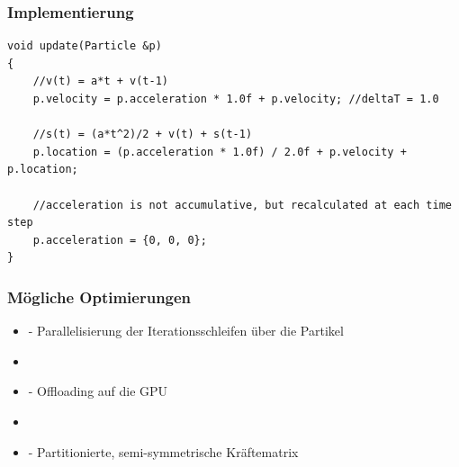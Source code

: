 \documentclass{beamer}
\begin{document}
\begin{frame}[fragile]
\frametitle{Implementierung}
\begin{lstlisting}[caption=Update Funktion]
void update(Particle &p)
{
	//v(t) = a*t + v(t-1)                                                            
	p.velocity = p.acceleration * 1.0f + p.velocity; //deltaT = 1.0                                  
                                                                                           
	//s(t) = (a*t^2)/2 + v(t) + s(t-1)                                               
	p.location = (p.acceleration * 1.0f) / 2.0f + p.velocity + p.location;
                                       	
	//acceleration is not accumulative, but recalculated at each time step          
	p.acceleration = {0, 0, 0};
}                                                            
\end{lstlisting}
\end{frame}

\begin{frame}
\frametitle{M\"ogliche Optimierungen}
\begin{itemize}[label={}]
 \item<1->- Parallelisierung der Iterationsschleifen \"uber die Partikel
 \item
 \item<2->- Offloading auf die GPU
 \item
 \item<3->- Partitionierte, semi-symmetrische Kr\"aftematrix
\end{itemize}
\end{frame}
\end{document}
